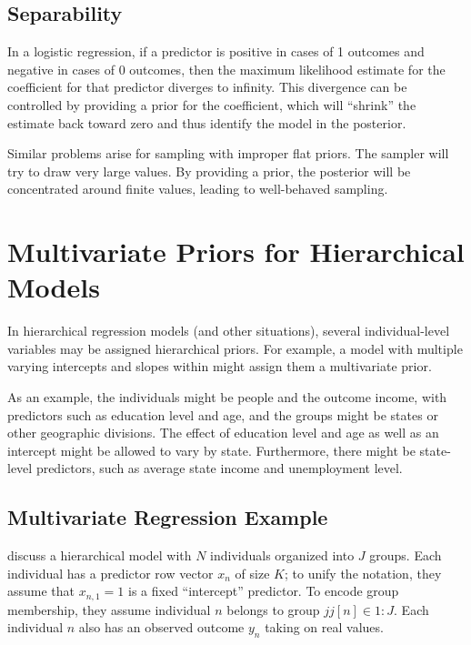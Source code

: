\subsection{Separability}

In a logistic regression, if a predictor is positive in cases of 1
outcomes and negative in cases of 0 outcomes, then the maximum
likelihood estimate for the coefficient for that predictor diverges to
infinity.  This divergence can be controlled by providing a prior for
the coefficient, which will ``shrink'' the estimate back toward zero
and thus identify the model in the posterior.  

Similar problems arise for sampling with improper flat priors.  The
sampler will try to draw very large values.  By providing a prior,
the posterior will be concentrated around finite values, leading to
well-behaved sampling.



\section{Multivariate Priors for Hierarchical Models}\label{multivariate-hierarchical-priors.section}

In hierarchical regression models (and other situations), several
individual-level variables may be assigned hierarchical priors.  For
example, a model with multiple varying intercepts and slopes within
might assign them a multivariate prior. 

As an example, the individuals might be people and the outcome income,
with predictors such as education level and age, and the groups might be states
or other geographic divisions.  The effect of education level and age
as well as an intercept might be allowed to vary by state.
Furthermore, there might be state-level predictors, such as average
state income and unemployment level.

\subsection{Multivariate Regression Example}

\cite[Chapter 13, Chapter 17]{GelmanHill:2007} discuss a hierarchical
model with $N$ individuals organized into $J$ groups.  Each individual
has a predictor row vector $x_n$ of size $K$; to unify the notation, they
assume that $x_{n,1} = 1$ is a fixed ``intercept'' predictor.  To
encode group membership, they assume individual $n$ belongs to group
$jj[n] \in 1{:}J$.  Each individual $n$ also has an observed outcome
$y_n$ taking on real values. 

